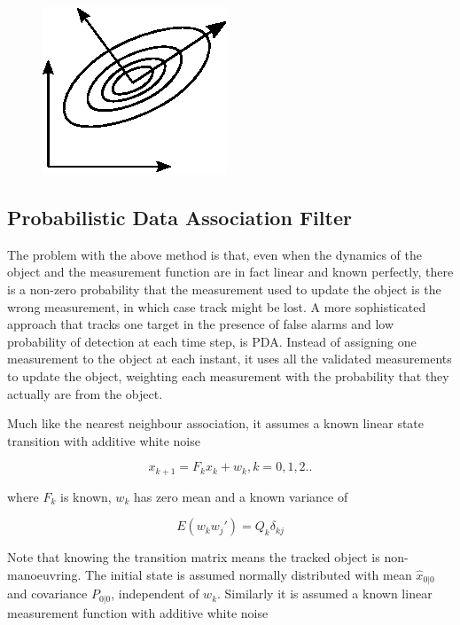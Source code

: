 \begin{figure}
    \centering
    \includegraphics[width=0.5\linewidth]{0_Images/3_Theory/GaussianPrincipalAxis.eps}
    \label{Fig:GaussianPrincipalAxes}
\end{figure}

\subsection{Probabilistic Data Association Filter}

The problem with the above method is that, even when the dynamics of the object and the measurement function are in fact linear and known perfectly, there is a non-zero probability that the measurement used to update the object is the wrong measurement, in which case track might be lost. A more sophisticated approach that tracks one target in the presence of false alarms and low probability of detection at each time step, is \gls{PDA}\cite{BarShalomPDA}. Instead of assigning one measurement to the object at each instant, it uses all the validated measurements to update the object, weighting each measurement with the probability that they actually are from the object.  

Much like the nearest neighbour association, it assumes a known linear state transition with additive white noise

\begin{equation}
    x_{k+1} = F_kx_k + w_k, k=0,1,2..
\end{equation}

where $F_k$ is known, $w_k$ has zero mean and a known variance of 

\begin{equation}
    E(w_kw_j') = Q_k\delta_{kj}
\end{equation}

Note that knowing the transition matrix means the tracked object is non-manoeuvring. The initial state is assumed normally distributed with mean $\hat{x}_{0|0}$ and covariance $P_{0|0}$, independent of $w_k$. Similarly it is assumed a known linear measurement function with additive white noise

